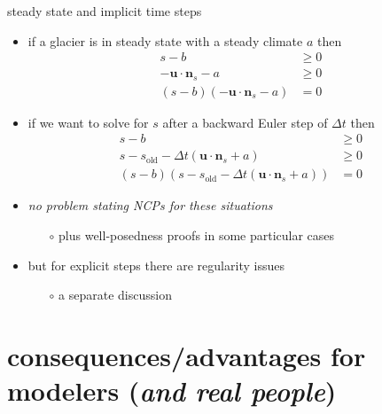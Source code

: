 \documentclass[10pt,hyperref,dvipsnames]{beamer}
\newcommand{\bn}{\mathbf{n}}
\newcommand{\bu}{\mathbf{u}}
\begin{document}
\begin{frame}{steady state and implicit time steps}
\begin{itemize}
\item if a glacier is in steady state with a steady climate $a$ then
\begin{align*}
s-b &\ge 0 \\
- \bu \cdot \bn_s - a &\ge 0 \\
(s-b) \left(- \bu \cdot \bn_s - a\right) &= 0
\end{align*}
\item if we want to solve for $s$ after a backward Euler step of $\Delta t$ then
\begin{align*}
s-b &\ge 0 \\
s - s_{\text{old}} - \Delta t\left(\bu \cdot \bn_s + a\right) &\ge 0 \\
(s-b) \left(s - s_{\text{old}} - \Delta t\left(\bu \cdot \bn_s + a\right)\right) &= 0
\end{align*}
\item \emph{no problem stating NCPs for these situations}
    \begin{itemize}
    \item[$\circ$] plus well-posedness proofs in some particular cases
    \end{itemize}
\item but for explicit steps there are regularity issues
    \begin{itemize}
    \item[$\circ$] a separate discussion
    \end{itemize}
\end{itemize}
\end{frame}


\section{consequences/advantages for modelers (\emph{and real people})}
\end{document}
